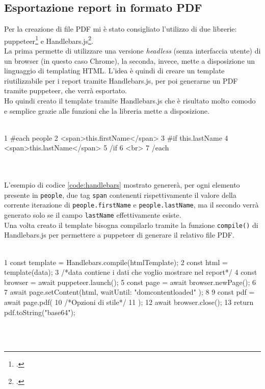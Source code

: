 \subsection{Esportazione report in formato PDF}
Per la creazione di file PDF mi è stato consigliato l'utilizzo di due librerie: puppeteer\footcite{site:puppeteer} e Handlebars.js\footcite{site:handlebars}.\\
La prima permette di utilizzare una versione \textit{headless} (senza interfaccia utente) di un browser (in questo caso Chrome), la seconda, invece, mette a disposizione un linguaggio di templating HTML. L'idea è quindi di creare un template riutilizzabile per i report tramite Handlebars.js, per poi generarne un PDF tramite puppeteer, che verrà esportato.\\
Ho quindi creato il template tramite Handlebars.js che è risultato molto comodo e semplice grazie alle funzioni che la libreria mette a disposizione.

\begin{code}[frame=tb, label={code:handlebars}, caption={Esempio di utilizzo di Handlebars.js}]\\
1 {{#each people}}
2   <span>{{this.firstName}}</span> 
3   {{#if this.lastName}}
4     <span>{{this.lastName}}</span>
5   {{/if}}
6   <br>
7 {{/each}} 
\end{code}\\\\

\noindent L'esempio di codice \ref{code:handlebars} mostrato genererà, per ogni elemento presente in \texttt{people}, due tag \texttt{span} contenenti rispettivamente il valore della corrente iterazione di \texttt{people.firstName} e \texttt{people.lastName}, ma il secondo verrà generato solo se il campo \texttt{lastName} effettivamente esiste.\\
Una volta creato il template bisogna compilarlo tramite la funzione \texttt{compile()} di Handlebars.js per permettere a puppeteer di generare il relativo file PDF.

\begin{code}[frame=tb, label={code:puppeteer}, caption={Esempio di utilizzo di puppeteer per la creazione di file PDF}]\\
1   const template = Handlebars.compile(htmlTemplate);
2   const html = template(data);  
3   /*data contiene i dati che voglio mostrare nel report*/
4   const browser = await puppeteer.launch();
5   const page = await browser.newPage();
6 
7   await page.setContent(html, { waitUntil: "domcontentloaded" });
8 
9   const pdf = await page.pdf({
10     /*Opzioni di stile*/
11  });
12  await browser.close();
13  return pdf.toString("base64");
\end{code}\\\\

